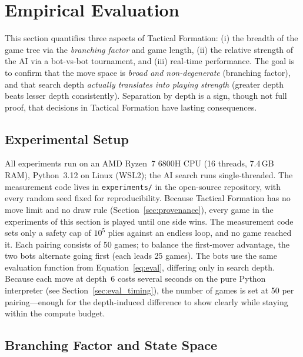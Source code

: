 \section{Empirical Evaluation}
\label{sec:eval}

This section quantifies three aspects of Tactical Formation: (i) the
breadth of the game tree via the \emph{branching factor} and game length, (ii) the relative
strength of the AI via a bot-vs-bot tournament, and (iii) real-time
performance. The goal is to confirm that the move space is \emph{broad and
non-degenerate} (branching factor), and that search depth \emph{actually
translates into playing strength} (greater depth beats lesser depth
consistently). Separation by depth is a sign, though not full proof,
that decisions in Tactical Formation have lasting consequences.

\subsection{Experimental Setup}
\label{sec:eval_setup}

All experiments run on an AMD Ryzen~7 6800H CPU (16 threads, 7.4\,GB RAM),
Python~3.12 on Linux (WSL2); the AI search runs single-threaded. The
measurement code lives in \texttt{experiments/} in the open-source
repository, with every random seed fixed for reproducibility. Because Tactical
Formation has no move limit and no draw rule (Section~\ref{sec:provenance}),
every game in the experiments of this section is played until one side
wins. The measurement code sets only a safety cap of $10^5$ plies against an
endless loop, and no game reached it. Each pairing
consists of 50 games; to balance the first-mover advantage, the two bots
alternate going first (each leads 25 games). The bots use the same
evaluation function from Equation~\eqref{eq:eval}, differing only in search
depth. Because each move at depth~6 costs several seconds on the pure Python
interpreter (see Section~\ref{sec:eval_timing}), the number of games is set
at 50 per pairing---enough for the depth-induced difference to show clearly
while staying within the compute budget.

\subsection{Branching Factor and State Space}
\label{sec:eval_branching}

